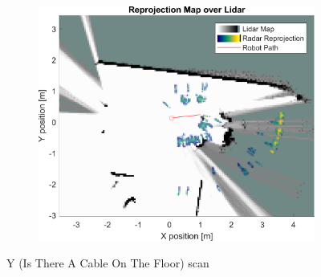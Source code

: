 \begin{figure}[htbp]
\begin{subfigure}[t]{0.475\linewidth}
        \includegraphics[width=\linewidth,max height=.475\textheight]{gfx/results/y_map.png}
    \end{subfigure}%
    \caption{Y (Is There A Cable On The Floor) scan}
\end{figure}
